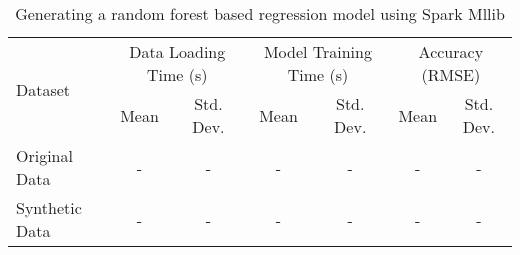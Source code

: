 \begin{table*}
    \renewcommand{\arraystretch}{1.3}
    \caption{Generating a random forest based regression model using Spark Mllib}
    \label{tab:resource-util}
    \begin{center}
        \begin{tabularx}{0.95\textwidth}{|X|c|c|c|c|c|c|}
            \hline
            \multirow{2}{*}{Dataset} & \multicolumn{2}{c|}{\cellcolor[gray]{0.7}Data Loading Time (s)} &\multicolumn{2}{c|}{\cellcolor[gray]{0.7}Model Training Time (s)} & \multicolumn{2}{c|}{\cellcolor[gray]{0.7}Accuracy (RMSE)}\\
            \cline{2-5}
             & \cellcolor[gray]{0.9}Mean & \cellcolor[gray]{0.9}Std. Dev.  &  \cellcolor[gray]{0.9}Mean & \cellcolor[gray]{0.9}Std. Dev. &  \cellcolor[gray]{0.9}Mean & \cellcolor[gray]{0.9}Std. Dev. \\
            \hline
            Original Data & - & - & - & - & - & - \\
            \hline
            Synthetic Data & - &  - & - & - & - & - \\
            \hline
		\end{tabularx}
	\end{center}
\end{table*}
